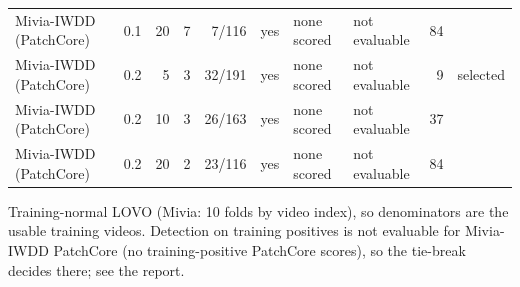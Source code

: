 \begin{table}[t]
{\begin{tabular}{llrrrlllrl}
Mivia-IWDD (PatchCore) & 0.1 & 20 & 7 & 7/116 & yes & none scored & not evaluable & 84 &  \\
Mivia-IWDD (PatchCore) & 0.2 & 5 & 3 & 32/191 & yes & none scored & not evaluable & 9 & selected \\
Mivia-IWDD (PatchCore) & 0.2 & 10 & 3 & 26/163 & yes & none scored & not evaluable & 37 &  \\
Mivia-IWDD (PatchCore) & 0.2 & 20 & 2 & 23/116 & yes & none scored & not evaluable & 84 &  \\
\bottomrule
\end{tabular}}
\begin{minipage}{\linewidth}\vspace{2pt}\footnotesize Training-normal LOVO (Mivia: 10 folds by video index), so denominators are the usable training videos. Detection on training positives is not evaluable for Mivia-IWDD PatchCore (no training-positive PatchCore scores), so the tie-break decides there; see the report.\end{minipage}
\end{table}
